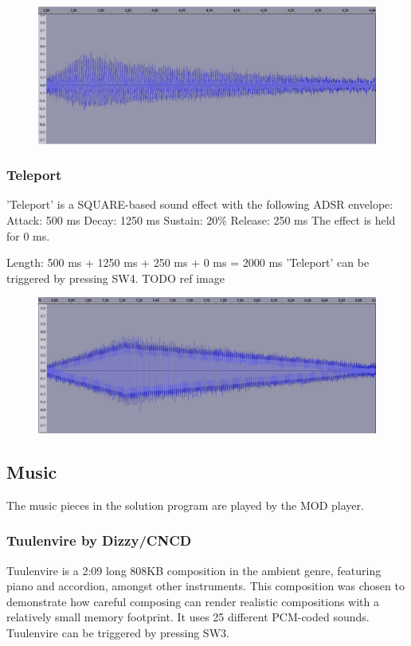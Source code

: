 \begin{figure}[H]
	\includegraphics[width = \textwidth]{images/SW5.png}
	\caption{}
	\label{img-protracker}
\end{figure}

\subsubsection{Teleport}
'Teleport' is a SQUARE-based sound effect with the following ADSR envelope:
Attack: 500 ms
Decay:  1250 ms
Sustain: 20\%
Release: 250 ms
The effect is held for 0 ms.

Length: 500 ms + 1250 ms + 250 ms + 0 ms = 2000 ms
'Teleport' can be triggered by pressing SW4.
TODO ref image

\begin{figure}[H]
	\includegraphics[width = \textwidth]{images/SW4.png}
	\caption{}
	\label{img-protracker}
\end{figure}


\subsection{Music}

The music pieces in the solution program are played by the MOD player.

\subsubsection{Tuulenvire by Dizzy/CNCD}
Tuulenvire is a 2:09 long 808KB composition in the ambient genre, featuring piano and accordion, amongst other instruments.
This composition was chosen to demonstrate how careful composing can render realistic compositions with a relatively small memory footprint.
It uses 25 different PCM-coded sounds.
Tuulenvire can be triggered by pressing SW3.

